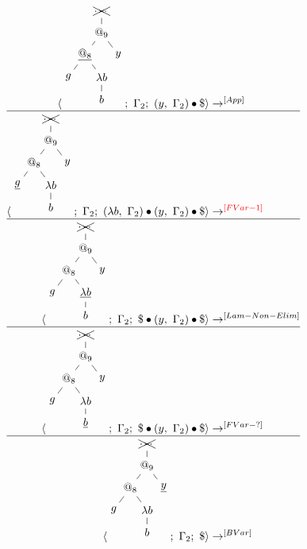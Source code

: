 \documentclass[a4paper, 10pt]{article}
\begin{document}
\begin{align*}
  \langle \begin{tikzpicture}[sibling distance=3em,level distance=2em]
    \node {\xcancel{$\dots$}}
    child { node {$@_9$}
      child { node {$\underline{@_8}$}
        child { node {$g$}}
        child { node {$\lambda b$}
          child { node {$b$}}}}
      child { node {$y$}}};
  \end{tikzpicture};\ \Gamma_2;\ (y,\ \Gamma_2) \bullet \$ \rangle & \rightarrow^{[App]}\\
  \hline
  \langle \begin{tikzpicture}[sibling distance=3em,level distance=2em]
    \node {\xcancel{$\dots$}}
    child { node {$@_9$}
      child { node {$@_8$}
        child { node {$\underline{g}$}}
        child { node {$\lambda b$}
          child { node {$b$}}}}
      child { node {$y$}}};
  \end{tikzpicture};\ \Gamma_2;\ (\lambda b,\ \Gamma_2) \bullet (y,\ \Gamma_2) \bullet \$ \rangle &
  \rightarrow^{\color{red}[FVar-1]}\\
  \hline
  \langle \begin{tikzpicture}[sibling distance=3em,level distance=2em]
    \node {\xcancel{$\dots$}}
    child { node {$@_9$}
      child { node {$@_8$}
        child { node {$g$}}
        child { node {$\underline{\lambda b}$}
          child { node {$b$}}}}
      child { node {$y$}}};
  \end{tikzpicture};\ \Gamma_2;\ \$ \bullet (y,\ \Gamma_2) \bullet \$ \rangle & \rightarrow^{[Lam-Non-Elim]}\\
  \hline
  \langle \begin{tikzpicture}[sibling distance=3em,level distance=2em]
    \node {\xcancel{$\dots$}}
    child { node {$@_9$}
      child { node {$@_8$}
        child { node {$g$}}
        child { node {$\lambda b$}
          child { node {$\underline{b}$}}}}
      child { node {$y$}}};
  \end{tikzpicture};\ \Gamma_2;\ \$ \bullet (y,\ \Gamma_2) \bullet \$ \rangle & \rightarrow^{[FVar-?]}\\
  \hline
  \langle \begin{tikzpicture}[sibling distance=3em,level distance=2em]
    \node {\xcancel{$\dots$}}
    child { node {$@_9$}
      child { node {$@_8$}
        child { node {$g$}}
        child { node {$\lambda b$}
          child { node {$b$}}}}
      child { node {$\underline{y}$}}};
  \end{tikzpicture};\ \Gamma_2;\ \$ \rangle & \rightarrow^{[BVar]}\\

\end{align*}
\end{document}
